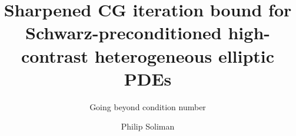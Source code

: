 \documentclass{tudelft-report}
\begin{document}
\renewcommand{\onlyinsubfile}[1]{}
\renewcommand{\notinsubfile}[1]{#1}

\frontmatter
\title{Sharpened CG iteration bound for Schwarz-preconditioned high-contrast heterogeneous elliptic PDEs}
\subtitle{Going beyond condition number}
\author{Philip Soliman}
\subject{WI5005: Thesis Project} %
\makecover



\tableofcontents

\mainmatter
\newpage

\newpage

\newpage
\nochapterimage
\printbibliography

\appendix
\end{document}
